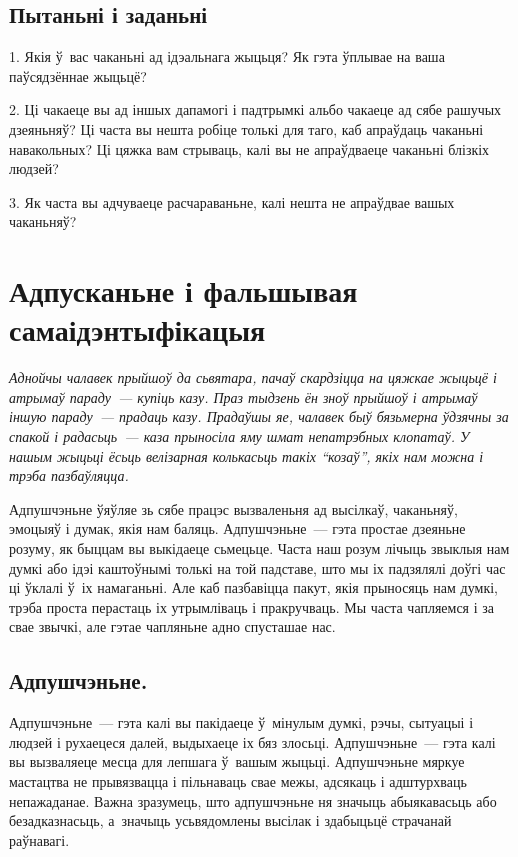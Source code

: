 \subsection*{Пытаньні і заданьні}

1. Якія ў~вас чаканьні ад ідэальнага жыцьця? Як гэта ўплывае на ваша паўсядзённае жыцьцё?

2. Ці чакаеце вы ад іншых дапамогі і падтрымкі альбо чакаеце ад сябе рашучых дзеяньняў? Ці часта вы нешта робіце толькі для таго, каб апраўдаць чаканьні навакольных? Ці цяжка вам стрываць, калі вы не апраўдваеце чаканьні блізкіх людзей?

3. Як часта вы адчуваеце расчараваньне, калі нешта не апраўдвае вашых чаканьняў?


\section{Адпусканьне і фальшывая самаідэнтыфікацыя}

\emph{Аднойчы чалавек прыйшоў да сьвятара, пачаў скардзіцца на цяжкае жыцьцё і атрымаў параду~--- купіць казу. Праз тыдзень ён зноў прыйшоў і атрымаў іншую параду~--- прадаць казу. Прадаўшы яе, чалавек быў бязьмерна ўдзячны за спакой і радасьць~--- каза прыносіла яму шмат непатрэбных клопатаў. У нашым жыцьці ёсьць велізарная колькасьць такіх ``козаў'', якіх нам можна і трэба пазбаўляцца.}


Адпушчэньне ўяўляе зь сябе працэс вызваленьня ад высілкаў, чаканьняў, эмоцыяў і думак, якія нам баляць. Адпушчэньне~--- гэта простае дзеяньне розуму, як быццам вы выкідаеце сьмецьце. Часта наш розум лічыць звыклыя нам думкі або ідэі каштоўнымі толькі на той падставе, што мы іх падзялялі доўгі час ці ўклалі ў~іх намаганьні. Але каб пазбавіцца пакут, якія прыносяць нам думкі, трэба проста перастаць іх утрымліваць і пракручваць. Мы часта чапляемся і за свае звычкі, але гэтае чапляньне адно спусташае нас.

\subsection*{Адпушчэньне.}

Адпушчэньне~--- гэта калі вы пакідаеце ў~мінулым думкі, рэчы, сытуацыі і людзей і рухаецеся далей, выдыхаеце іх бяз злосьці. Адпушчэньне~--- гэта калі вы вызваляеце месца для лепшага ў~вашым жыцьці. Адпушчэньне мяркуе мастацтва не прывязвацца і пільнаваць свае межы, адсякаць і адштурхваць непажаданае. Важна зразумець, што адпушчэньне ня значыць абыякавасьць або безадказнасьць, а~значыць усьвядомлены высілак і здабыцьцё страчанай раўнавагі.

